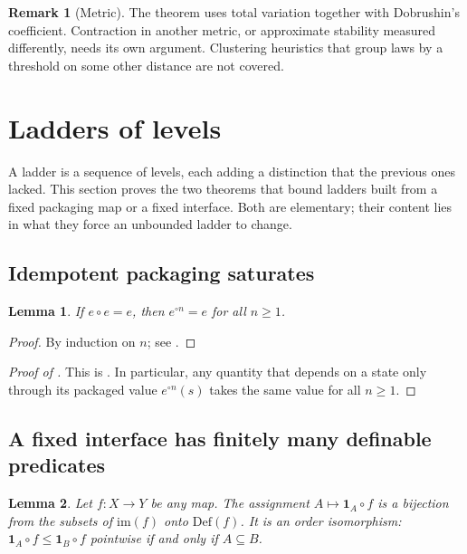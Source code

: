 \documentclass[11pt]{article}
\newtheorem{lemma}{Lemma}[section]
\theoremstyle{definition}
\newtheorem{remark}{Remark}[section]
\newcommand{\Def}{\mathrm{Def}}
\newcommand{\im}{\mathrm{im}}
\newcommand{\1}{\mathbf{1}}
\begin{document}
\begin{remark}[Metric]
The theorem uses total variation together with Dobrushin's coefficient.
Contraction in another metric, or approximate stability measured differently, needs its own argument.
Clustering heuristics that group laws by a threshold on some other distance are not covered.
\end{remark}
 \section{Ladders of levels}\label{sec:bounded-interface}

A ladder is a sequence of levels, each adding a distinction that the previous ones lacked.
This section proves the two theorems that bound ladders built from a fixed packaging map or a fixed interface.
Both are elementary; their content lies in what they force an unbounded ladder to change.

\subsection{Idempotent packaging saturates}

\begin{lemma}\label{lem:idempotent-iterates}
If $e\circ e=e$, then $e^{\circ n}=e$ for all $n\ge 1$.
\end{lemma}

\begin{proof}
By induction on $n$; see .
\end{proof}

\begin{proof}[Proof of ]
This is .
In particular, any quantity that depends on a state only through its packaged value $e^{\circ n}(s)$ takes the same value for all $n\ge 1$.
\end{proof}

\subsection{A fixed interface has finitely many definable predicates}

\begin{lemma}\label{lem:definability-bijection}
Let $f:X\to Y$ be any map. The assignment $A\mapsto\1_A\circ f$ is a bijection from the subsets of $\im(f)$ onto $\Def(f)$. It is an order isomorphism: $\1_A\circ f\le\1_B\circ f$ pointwise if and only if $A\subseteq B$.
\end{lemma}
\end{document}
